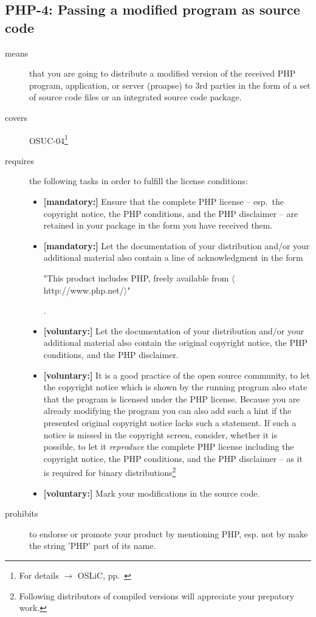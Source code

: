 \subsection{PHP-4: Passing a modified program as source code}
\label{OSUC-04-PHP}

\begin{description}
\item[means] that you are going to distribute a modified version of the received
PHP program, application, or server (proapse) to 3rd parties in the form of a set
of source code files or an integrated source code package.
\item[covers] OSUC-04\footnote{For details $\rightarrow$ OSLiC, pp.\ \pageref{OSUC-04-DEF}}
\item[requires] the following tasks in order to fulfill the license conditions:
\begin{itemize}

  \item \textbf{[mandatory:]} Ensure that the complete PHP license -- esp.\
  the copyright notice, the PHP conditions, and the PHP disclaimer -- are
  retained in your package in the form you have received them.
  
  \item \textbf{[mandatory:]} Let the documentation of your distribution and/or
  your additional material also contain a line of acknowledgment in the form
  \begin{footnotesize}"This product includes PHP, freely available from
  $\langle$http://www.php.net/$\rangle$"\end{footnotesize}.
    
  \item \textbf{[voluntary:]} Let the documentation of your distribution and/or
  your additional material also contain the original copyright notice, the PHP
  conditions, and the PHP disclaimer.
     
  \item \textbf{[voluntary:]} It is a good practice of the open source
  community, to let the copyright notice which is shown by the running program
  also state that the program is licensed under the PHP license. Because you are
  already modifying the program you can also add such a hint if the presented
  original copyright notice lacks such a statement. If such a notice is missed
  in the copyright screen, consider, whether it is possible, to let it
  \emph{reproduce} the complete PHP license including the copyright notice, the
  PHP conditions, and the PHP disclaimer -- as it is required for binary
  distributions\footnote{Following distributors of compiled versions will
  appreciate your prepatory work.}
  
  \item \textbf{[voluntary:]} Mark your modifications in the source code.
  
  
\end{itemize}

\item[prohibits] to endorse or promote your product by mentioning PHP, esp. not
by make the string 'PHP' part of its name.

\end{description}

